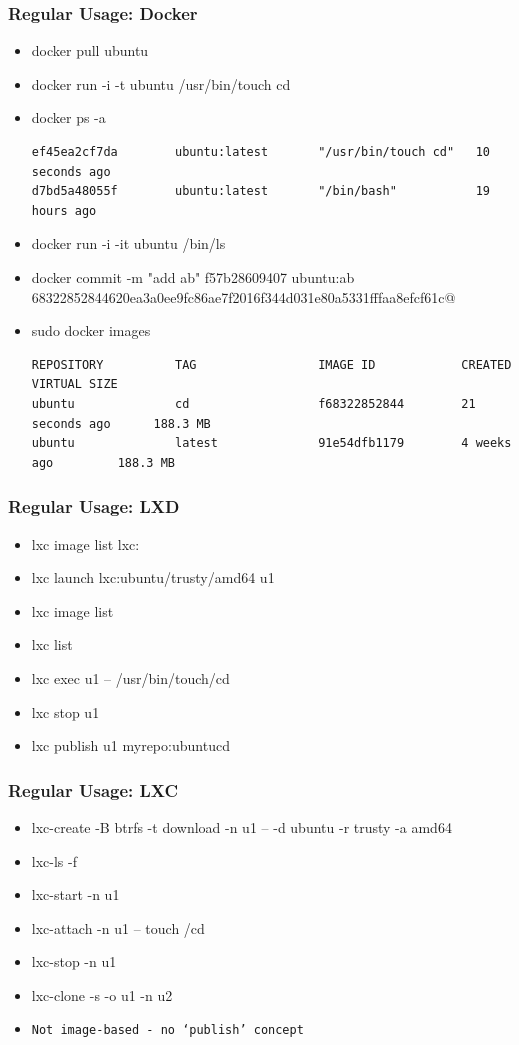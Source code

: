 \documentclass{beamer}
\begin{document}
\begin{frame}[fragile]
\frametitle{Regular Usage: Docker}
\begin{itemize}
\item docker pull ubuntu
\item docker run -i -t ubuntu /usr/bin/touch cd
\item docker ps -a
{\tiny
\begin{verbatim}
ef45ea2cf7da        ubuntu:latest       "/usr/bin/touch cd"   10 seconds ago
d7bd5a48055f        ubuntu:latest       "/bin/bash"           19 hours ago
\end{verbatim}
}

\item docker run -i -it ubuntu /bin/ls
\item docker commit -m "add ab" f57b28609407 ubuntu:ab
{\tiny
\verb@f68322852844620ea3a0ee9fc86ae7f2016f344d031e80a5331fffaa8efcf61c@
}

\item sudo docker images
{\tiny
\begin{verbatim}
REPOSITORY          TAG                 IMAGE ID            CREATED             VIRTUAL SIZE
ubuntu              cd                  f68322852844        21 seconds ago      188.3 MB
ubuntu              latest              91e54dfb1179        4 weeks ago         188.3 MB
\end{verbatim}
}
\end{itemize}
\end{frame}

\begin{frame}
\frametitle{Regular Usage: LXD}
\begin{itemize}
\item lxc image list lxc:
\item lxc launch lxc:ubuntu/trusty/amd64 u1
\item lxc image list
\item lxc list
\item lxc exec u1 -- /usr/bin/touch/cd
\item lxc stop u1
\item lxc publish u1 myrepo:ubuntucd
\end{itemize}
\end{frame}

\begin{frame}
\frametitle{Regular Usage: LXC}
\begin{itemize}
\item lxc-create -B btrfs -t download -n u1 -- -d ubuntu -r trusty -a amd64
\item lxc-ls -f
\item lxc-start -n u1
\item lxc-attach -n u1 -- touch /cd
\item lxc-stop -n u1
\item lxc-clone -s -o u1 -n u2
\item \texttt{Not image-based - no `publish' concept}
\end{itemize}
\end{frame}
\end{document}
